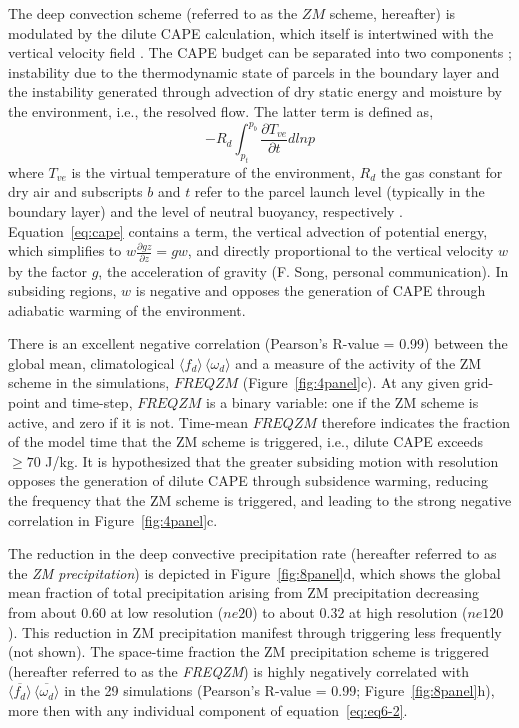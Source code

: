 The \cite{ZM1995AO} deep convection scheme (referred to as the $ZM$ scheme, hereafter) is modulated by the dilute CAPE calculation, which itself is intertwined with the vertical velocity field \citep{SZ2018JCLIM}. The CAPE budget can be separated into two components \citep{Z2002JGR}; instability due to the thermodynamic state of parcels in the boundary layer and the instability generated through advection of dry static energy and moisture by the environment, i.e., the resolved flow. The latter term is defined as, 
\begin{equation}
-R_d \int_{p_t}^{p_b} \frac{\partial T_{ve}}{\partial t} dlnp \label{eq:cape}
\end{equation}
where $T_{ve}$ is the virtual temperature of the environment, $R_d$ the gas constant for dry air and subscripts $b$ and $t$ refer to the parcel launch level (typically in the boundary layer) and the level of neutral buoyancy, respectively \citep{Z2002JGR}. Equation~\ref{eq:cape} contains a term, the vertical advection of potential energy, which simplifies to $w \frac{\partial gz}{\partial z} = gw$, and directly proportional to the vertical velocity $w$ by the factor $g$, the acceleration of gravity (F. Song, personal communication). In subsiding regions, $w$ is negative and opposes the generation of CAPE through adiabatic warming of the environment.

There is an excellent negative correlation (Pearson's R-value = 0.99) between the global mean, climatological $\langle f_{d} \rangle \, \langle \omega_{d} \rangle$ and a measure of the activity of the ZM scheme in the simulations, $FREQZM$ (Figure~\ref{fig:4panel}c). At any given grid-point and time-step, $FREQZM$ is a binary variable: one if the ZM scheme is active, and zero if it is not. Time-mean $FREQZM$ therefore indicates the fraction of the model time that the ZM scheme is triggered, i.e., dilute CAPE exceeds $\geq 70$ J/kg. It is hypothesized that the greater subsiding motion with resolution opposes the generation of dilute CAPE through subsidence warming, reducing the frequency that the ZM scheme is triggered, and leading to the strong negative correlation in Figure~\ref{fig:4panel}c.

The reduction in the \cite{ZM1995AO} deep convective precipitation rate (hereafter referred to as the {\em{ZM precipitation}}) is depicted in Figure~\ref{fig:8panel}d, which shows the global mean fraction of total precipitation arising from ZM precipitation decreasing from about $0.60$ at low resolution ($ne20$) to about $0.32$ at high resolution ($ne120$). This reduction in ZM precipitation manifest through triggering less frequently (not shown). The space-time fraction the ZM precipitation scheme is triggered (hereafter referred to as the {\em{FREQZM}}) is highly negatively correlated with $\overline{\langle f_{d} \rangle} \, \overline{\langle \omega_{d} \rangle}$ in the 29 simulations (Pearson's R-value = 0.99; Figure~\ref{fig:8panel}h), more then with any individual component of equation~\ref{eq:eq6-2}.

